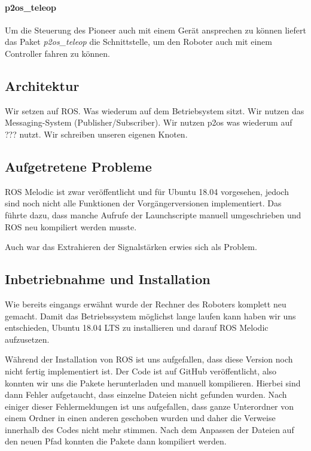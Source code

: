 \documentclass{scrartcl}%
\begin{document}
\paragraph{p2os\_teleop}
Um die Steuerung des Pioneer auch mit einem Gerät ansprechen zu können liefert das Paket \textit{p2os\_teleop} die Schnittstelle, um den Roboter auch mit einem Controller fahren zu können.


\subsection{Architektur}
Wir setzen auf ROS. Was wiederum auf dem Betriebsystem sitzt. Wir nutzen das Messaging-System (Publisher/Subscriber). Wir nutzen p2os was wiederum auf ??? nutzt. Wir schreiben unseren eigenen Knoten.

\subsection{Aufgetretene Probleme}
ROS Melodic ist zwar veröffentlicht und für Ubuntu 18.04 vorgesehen, jedoch sind noch nicht alle Funktionen der Vorgängerversionen implementiert. Das führte dazu, dass manche Aufrufe der Launchscripte manuell umgeschrieben und ROS neu kompiliert werden musste.

Auch war das Extrahieren der Signalstärken erwies sich als Problem.

\subsection{Inbetriebnahme und Installation}
Wie bereits eingangs erwähnt wurde der Rechner des Roboters komplett neu gemacht. Damit das Betriebssystem möglichst lange laufen kann haben wir uns entschieden, Ubuntu 18.04 LTS zu installieren und darauf ROS Melodic aufzusetzen.

Während der Installation von ROS ist uns aufgefallen, dass diese Version noch nicht fertig implementiert ist. Der Code ist auf GitHub veröffentlicht, also konnten wir uns die Pakete herunterladen und manuell kompilieren. Hierbei sind dann Fehler aufgetaucht, dass einzelne Dateien nicht gefunden wurden. Nach einiger dieser Fehlermeldungen ist uns aufgefallen, dass ganze Unterordner von einem Ordner in einen anderen geschoben wurden und daher die Verweise innerhalb des Codes nicht mehr stimmen. Nach dem Anpassen der Dateien auf den neuen Pfad konnten die Pakete dann kompiliert werden.
\end{document}
